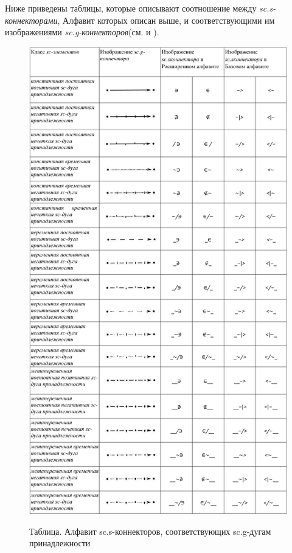 Ниже приведены таблицы, которые описывают соотношение между \textit{sc.s-коннекторами}, Алфавит которых описан выше, и соответствующими им изображениями \textit{sc.g-коннекторов}(см.  и ).

\newpage
\begin{figure}[H]
	\centering
	\caption{Таблица. Алфавит sc.s-коннекторов, соответствующих sc.g-дугам принадлежности\scnsupergroupsign}
	\includegraphics[scale=0.8]{images/intro/scs_membership_connectors.pdf}
	\label{fig:scs_membership_connectors}
\end{figure}



